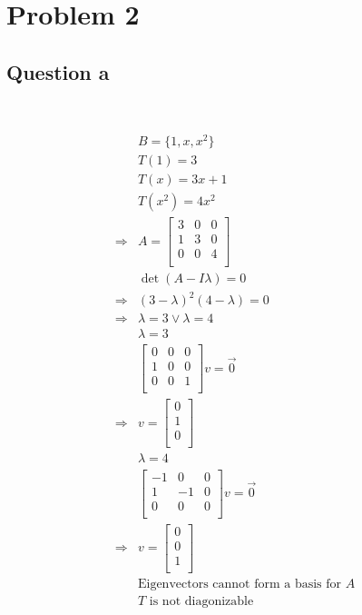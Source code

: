\documentclass{article}
\begin{document}
\newpage

\section{Problem 2}

\subsection{Question a}

~

\begin{equation*}
    \begin{split}
        &B=\{1,x,x^2\}\\
        &T(1)=3\\
        &T(x)=3x+1\\
        &T(x^2)=4x^2\\
        \Rightarrow&A=\begin{bmatrix}
            3&0&0\\
            1&3&0\\
            0&0&4\\
        \end{bmatrix}\\
        &\det(A-I\lambda)=0\\
        \Rightarrow&(3-\lambda)^2(4-\lambda)=0\\
        \Rightarrow&\lambda=3\lor\lambda=4\\
        &\lambda=3\\
        &\begin{bmatrix}
            0&0&0\\
            1&0&0\\
            0&0&1\\
        \end{bmatrix}v=\overrightarrow{0}\\
        \Rightarrow&v=\begin{bmatrix}
            0\\
            1\\
            0\\
        \end{bmatrix}\\
        &\lambda=4\\
        &\begin{bmatrix}
            -1&0&0\\
            1&-1&0\\
            0&0&0\\
        \end{bmatrix}v=\overrightarrow{0}\\
        \Rightarrow&v=\begin{bmatrix}
            0\\
            0\\
            1\\
        \end{bmatrix}\\
        &\text{Eigenvectors cannot form a basis for }A\\
        &T\text{ is not diagonizable}\\
    \end{split}
\end{equation*}
\end{document}
